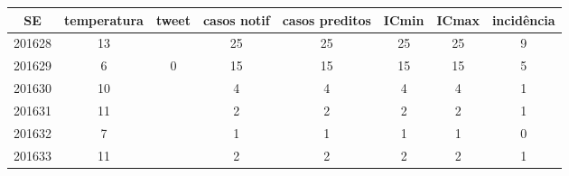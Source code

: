 \begin{tabular}{c|ccccccc}
  \hline
SE & temperatura & tweet & casos notif & casos preditos & ICmin & ICmax & incidência \\ 
  \hline
201628 & 13 &  & 25 & 25 & 25 & 25 & 9 \\ 
  201629 & 6 & 0 & 15 & 15 & 15 & 15 & 5 \\ 
  201630 & 10 &  & 4 & 4 & 4 & 4 & 1 \\ 
  201631 & 11 &  & 2 & 2 & 2 & 2 & 1 \\ 
  201632 & 7 &  & 1 & 1 & 1 & 1 & 0 \\ 
  201633 & 11 &  & 2 & 2 & 2 & 2 & 1 \\ 
   \hline
\end{tabular}
